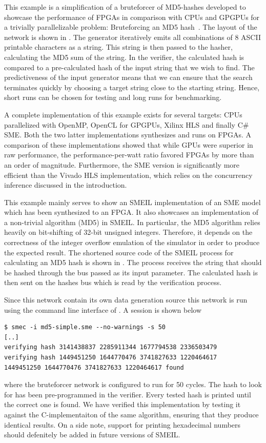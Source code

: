 This example is a simplification of a bruteforcer of MD5-hashes developed to
showcase the performance of FPGAs in comparison with CPUs and GPGPUs for a
trivially parallelizable problem: Bruteforcing an MD5
hash~\cite{johnsen2018md5}. The layout of the network is shown in
. The generator iteratively emits all combinations of 8 ASCII
printable characters as a string. This string is then passed to the hasher,
calculating the MD5 sum of the string. In the verifier, the calculated hash is
compared to a pre-calculated hash of the input string that we wish to find. The
predictiveness of the input generator means that we can ensure that the search
terminates quickly by choosing a target string close to the starting
string. Hence, short runs can be chosen for testing and long runs for
benchmarking.

A complete implementation of this example exists for several targets: CPUs
parallelized with OpenMP, OpenCL for GPGPUs, Xilinx HLS and finally C\# SME.
Both the two latter implementations synthesizes and runs on FPGAs. A comparison
of these implementations showed that while GPUs were superior in raw
performance, the performance-per-watt ratio favored FPGAs by more than an order
of magnitude. Furthermore, the SME version is significantly more efficient than
the Vivado HLS implementation, which relies on the concurrency inference
discussed in the introduction.

This example mainly serves to show an SMEIL implementation of an SME model which
has been synthesized to an FPGA. It also showcases an implementation of a
non-trivial algorithm (MD5) in SMEIL. In particular, the MD5 algorithm relies
heavily on bit-shifting of 32-bit unsigned integers. Therefore, it depends on
the correctness of the integer overflow emulation of the \libsme{} simulator in
order to produce the expected result. The shortened source code of the SMEIL
process for calculating an MD5 hash is shown in . The
process receives the string that should be hashed through the bus passed as its
{\ttfamily input} parameter. The calculated hash is then sent on the {\ttfamily
  hashes} bus which is read by the verification process.

Since this network contain its own data generation source this network is run
using the command line interface of \libsme. A session is shown below
\begin{verbatim}
$ smec -i md5-simple.sme --no-warnings -s 50 
[..]
verifying hash 3141438837 2285911344 1677794538 2336503479
verifying hash 1449451250 1644770476 3741827633 1220464617
1449451250 1644770476 3741827633 1220464617 found
\end{verbatim}
where the bruteforcer network is configured to run for 50 cycles. The hash to
look for has been pre-programmed in the verifier. Every tested hash is printed
until the correct one is found. We have verified this implementation by testing
it against the C-implementaiton of the same algorithm, ensuring that they
produce identical results. On a side note, support for printing hexadecimal
numbers should defenitely be added in future versions of SMEIL.


